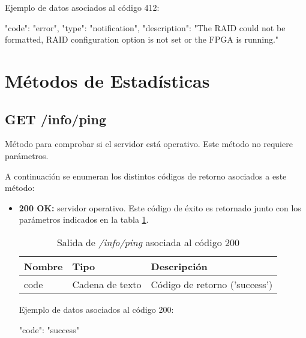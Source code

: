 \begin{itemize}
{\begin{minipage}{\textwidth}
Ejemplo de datos asociados al código 412:

\begin{code}[language=json]
{
  "code": "error",
  "type": "notification",
  "description": "The RAID could not be formatted, RAID configuration option is not set or the FPGA is running."
}
\end{code}
\end{minipage}
}

\end{itemize}



\section{Métodos de Estadísticas \label{extra:api:estadisticas}}

%
%
\subsection{GET /info/ping}
Método para comprobar si el servidor está operativo. Este método no requiere parámetros.

A continuación se enumeran los distintos códigos de retorno asociados a este método:
\begin{itemize}

\item{\textbf{200 OK:} servidor operativo. Este código de éxito es retornado junto con los parámetros indicados en la tabla \ref{extra:api:infoping:ok}.
\begin{table}[H]
\centering
\begin{tabular}{|l|l|l|}
\hline
\rowcolor[HTML]{F5F5F5}
\textbf{Nombre}  & \textbf{Tipo}   & \textbf{Descripción}              \\ \hline
code             & Cadena de texto & Código de retorno ('success')     \\ \hline
\end{tabular}
\caption{Salida de \textit{/info/ping} asociada al código 200}
\label{extra:api:infoping:ok}
\end{table}
\begin{minipage}{\textwidth}
Ejemplo de datos asociados al código 200:

\begin{code}[language=json]
{
  "code": "success"
}
\end{code}
\end{minipage}
}

\end{itemize}


